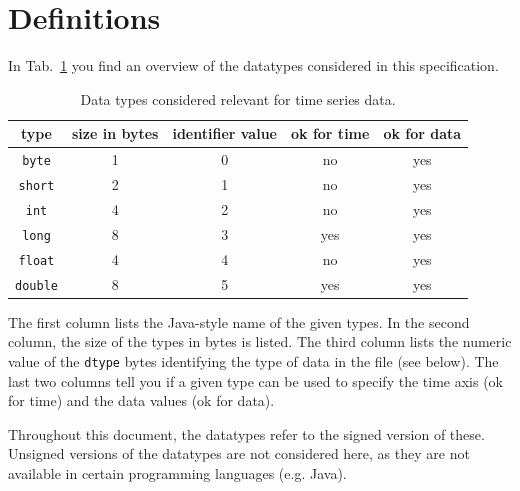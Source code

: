\documentclass[a4paper,10pt]{article}
\begin{document}
\section{Definitions}\label{sec:definitions}
In Tab.~\ref{tab:datatypes} you find an overview of the datatypes considered in this specification.
\begin{table}[htbp]
 \centering
 \begin{tabular}{|c|c|c|c|c|}
    \hline
    type            & size in bytes & identifier value & ok for time & ok for data \\
    \hline
    \texttt{byte}   & 1             & 0                & no          & yes         \\
    \hline
    \texttt{short}  & 2             & 1                & no          & yes         \\
    \hline
    \texttt{int}    & 4             & 2                & no          & yes         \\
    \hline
    \texttt{long}   & 8             & 3                & yes         & yes         \\
    \hline
    \texttt{float}  & 4             & 4                & no          & yes         \\
    \hline
    \texttt{double} & 8             & 5                & yes         & yes         \\
    \hline
 \end{tabular}
 \caption{Data types considered relevant for time series data.}
 \label{tab:datatypes}
\end{table}

The first column lists the Java-style name of the given types.
In the second column, the size of the types in bytes is listed.
The third column lists the numeric value of the \texttt{dtype} bytes identifying the type of data in the file (see below).
The last two columns tell you if a given type can be used to specify the time axis (ok for time)
and the data values (ok for data).

Throughout this document, the datatypes refer to the signed version of these. Unsigned versions of the datatypes are not
considered here, as they are not available in certain programming languages (e.g. Java).
\end{document}
